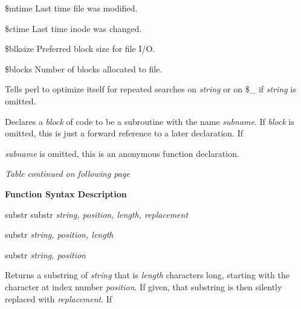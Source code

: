 \documentclass[a4paper,11pt]{book}
\begin{document}
\noindent 

\noindent 

\noindent 

 \$mtime Last time file was modified.

\noindent 

\noindent 

\noindent 

 \$ctime Last time inode was changed.

\noindent 

\noindent 

\noindent 

 \$blksize Preferred block size for file I/O.

\noindent 

\noindent 

\noindent 

 \$blocks Number of blocks allocated to file.

\noindent 

\noindent Tells perl to optimize itself for repeated searches on \textit{string }or on \$\_ if \textit{string }is omitted.

\noindent 

\noindent Declares a \textit{block }of code to be a subroutine with the name \textit{subname}. If \textit{block }is omitted, this is just a forward reference to a later declaration. If

\noindent \textit{subname }is omitted, this is an anonymous function declaration.

\noindent \textit{Table continued on following page}

\noindent  

\noindent  

\noindent 

\noindent 

\noindent 

\noindent \textbf{Function Syntax Description}

\noindent 

\noindent substr substr \textit{string, position, length, replacement}

\noindent 

\noindent substr \textit{string, position, length}

\noindent 

\noindent substr \textit{string, position}

\noindent 

\noindent Returns a substring of \textit{string }that is \textit{length }characters long, starting with the character at index number \textit{position}. If given, that substring is then silently replaced with \textit{replacement}. If
\end{document}
